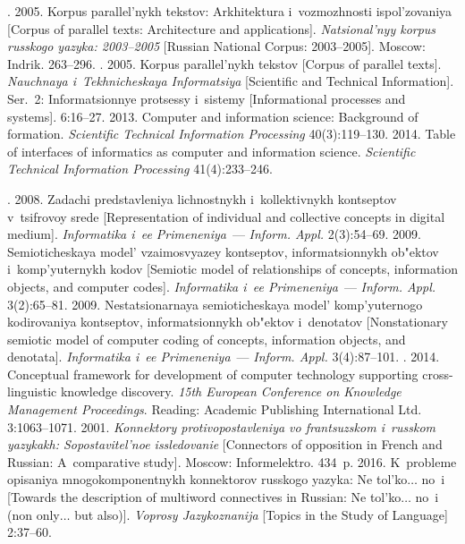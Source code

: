 \begin{multicols}{2}
{{\begin{thebibliography}{99}
. 2005. Korpus parallel'nykh tekstov: 
Arkhitektura i~vozmozh\-no\-sti ispol'zovaniya [Corpus of parallel texts: Architecture and applications]. 
\textit{Natsional'nyy korpus russkogo yazyka: 2003--2005} 
[Russian National Corpus: 2003--2005]. Moscow: Indrik. 263--296.
. 2005. Korpus 
parallel'nykh tekstov [Corpus of parallel texts]. \textit{Nauchnaya i~Tekhnicheskaya 
Informatsiya} [Scientific and Technical Information]. Ser.~2: Informatsionnye 
protsessy i~sistemy [Informational processes and systems]. 6:16--27.
 2013. Computer and information science: Background of 
formation. \textit{Scientific Technical Information Processing} 40(3):119--130.
 2014. Table of interfaces of informatics as computer and 
information science. \textit{Scientific Technical Information Processing} 
41(4):233--246.

. 2008. Zadachi 
predstavleniya lichnostnykh i~kollektivnykh kontseptov v~tsifrovoy srede 
[Representation of individual and collective concepts in digital medium].  
\textit{Informatika i~ee Primeneniya}~--- \textit{Inform. Appl.} 2(3):54--69.
 2009. Semioticheskaya model' vzaimosvyazey kontseptov, 
informatsionnykh ob"ektov i~komp'yuternykh kodov [Semiotic model of 
relationships of concepts, information objects, and computer codes]. 
\textit{Informatika i~ee Primeneniya}~--- \textit{Inform. Appl.} 3(2):65--81.
 2009. Nestatsionarnaya semioticheskaya model' 
komp'yuternogo kodirovaniya kontseptov, informatsionnykh ob"ektov 
i~denotatov [Nonstationary semiotic model of computer coding of concepts, 
information objects, and denotata]. \textit{Informatika i~ee Primeneniya}~--- 
\textit{Inform. Appl.} 3(4):87--101.
. 2014. Conceptual framework for development of computer 
technology supporting cross-linguistic knowledge discovery. \textit{15th European 
Conference on Knowledge Management Proceedings}. Reading: Academic 
Publishing International Ltd. 3:1063--1071.
 2001. \textit{Konnektory protivopostavleniya 
vo frantsuzskom i~russkom yazykakh: Sopostavitel'noe issledovanie} [Connectors 
of opposition in French and Russian: A~comparative study]. Moscow: 
Informelektro. 434~p.
 2016. K~probleme opisaniya mnogokomponentnykh 
konnektorov russkogo yazyka: Ne tol'ko$\ldots$ no~i [Towards the 
description of multiword connectives in Russian: Ne tol'ko$\ldots$ no~i 
(non only$\ldots$ but also)]. \textit{Voprosy Jazykoznanija} [Topics in the Study 
of Language] 2:37--60.
\end{thebibliography}

 }
 }

\end{multicols}

